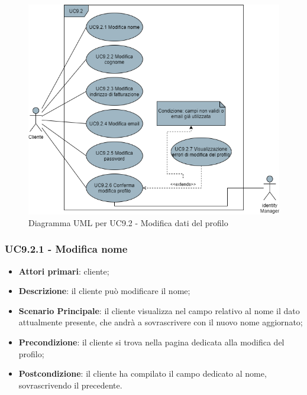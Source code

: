 \begin{figure}[H]
\centering
\includegraphics[scale=0.6]{res/UseCase/Immagini/ModificaProfilo}
\caption{Diagramma UML per UC9.2 - Modifica dati del profilo}
\end{figure}

\subsubsection{UC9.2.1 - Modifica nome}
\begin{itemize}
\item \textbf{Attori primari}: cliente;
\item \textbf{Descrizione}: il cliente può modificare il nome;
\item \textbf{Scenario Principale}: il cliente visualizza nel campo relativo al nome il dato attualmente presente, che andrà a sovrascrivere con il nuovo nome aggiornato;
\item \textbf{Precondizione}: il cliente si trova nella pagina dedicata alla modifica del profilo;
\item \textbf{Postcondizione}: il cliente ha compilato il campo dedicato al nome, sovrascrivendo il precedente.
\end{itemize}

